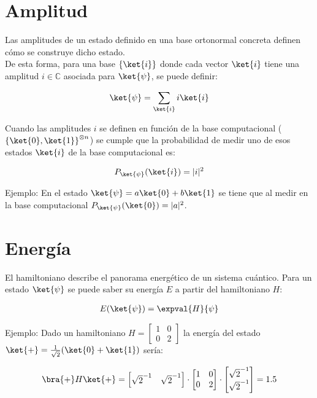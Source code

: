 \section{Amplitud}

Las amplitudes de un estado definido en una base ortonormal concreta definen cómo se construye dicho estado.
\\
De esta forma, para una base $\{\ket{i}\}$ donde cada vector $\ket{i}$ tiene una amplitud $i \in \mathbb{C}$ asociada para $\ket{\psi}$, se puede definir:

\begin{align}
  \ket{\psi} = \sum_{\ket{i}} i \ket{i}
\end{align}

Cuando las amplitudes $i$ se definen en función de la base computacional (${\{\ket{0}, \ket{1}\}}^{\otimes n}$) se cumple que la probabilidad de medir uno de esos estados $\ket{i}$ de la base computacional es:

\begin{align}
  P_{\ket{\psi}}(\ket{i}) = |i|^2
\end{align}

Ejemplo: En el estado $\ket{\psi} = a\ket{0} + b\ket{1}$ se tiene que al medir en la base computacional $P_{\ket{\psi}}(\ket{0}) = |a|^2$.

\section{Energía\label{sec:8-concepto-energia}}

El hamiltoniano describe el panorama energético de un sistema cuántico.
Para un estado $\ket{\psi}$ se puede saber su energía $E$ a partir del hamiltoniano $H$:

\begin{align}
  E(\ket{\psi}) = \expval{H}{\psi}
\end{align}

Ejemplo: Dado un hamiltoniano $H = \begin{bmatrix} 1 & 0 \\ 0 & 2 \end{bmatrix}$ la energía del estado $\ket{+} = \frac{1}{\sqrt{2}} (\ket{0} + \ket{1})$ sería:

\begin{align}
  \bra{+}H\ket{+} = \begin{bmatrix} \sqrt{2}^{-1} & \sqrt{2}^{-1}\end{bmatrix} \cdot
  \begin{bmatrix}
    1 & 0 \\
    0 & 2
  \end{bmatrix} \cdot \begin{bmatrix} \sqrt{2}^{-1} \\ \sqrt{2}^{-1}\end{bmatrix} = 1.5
\end{align}


